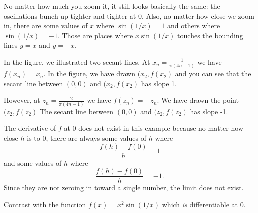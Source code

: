 \documentclass[11pt]{book}
\numberwithin{example}{chapter}
\begin{document}
\begin{center}
\end{center}

No matter how much you zoom it, it still looks basically the same: the oscillations bunch up tighter and tighter at 0.  Also, no matter how close we zoom in, there are some values of $x$ where $\sin(1/x)=1$ and others where $\sin(1/x)=-1$.  Those are places where $x\sin(1/x)$ touches the bounding lines $y=x$ and $y=-x$.

In the figure, we illustrated two secant lines.  At $x_n=\frac{1}{\pi(4n+1)}$ we have $f(x_n)=x_n$.  In the figure, we have drawn $(x_2,f(x_2)$ and you can see that the secant line between $(0,0)$ and $(x_2,f(x_2)$ has slope 1.  

However, at $z_n=\frac{2}{\pi(4n-1)}$ we have $f(z_n)=-z_n$.  We have drawn the point $(z_2,f(z_2)$  The secant line between $(0,0)$ and $(z_2,f(z_2)$ has slope -1.  

The derivative of $f$ at 0 does not exist in this example because no matter how close $h$ is to 0, there are always some values of $h$ where 
$$\frac{f(h)-f(0)}{h}=1$$
and some values of $h$ where 
$$\frac{f(h)-f(0)}{h}=-1.$$
Since they are not zeroing in toward a single number, the limit does not exist.  

Contrast with the function $f(x)=x^2\sin(1/x)$ which \emph{is} differentiable at 0.  
\end{document}
